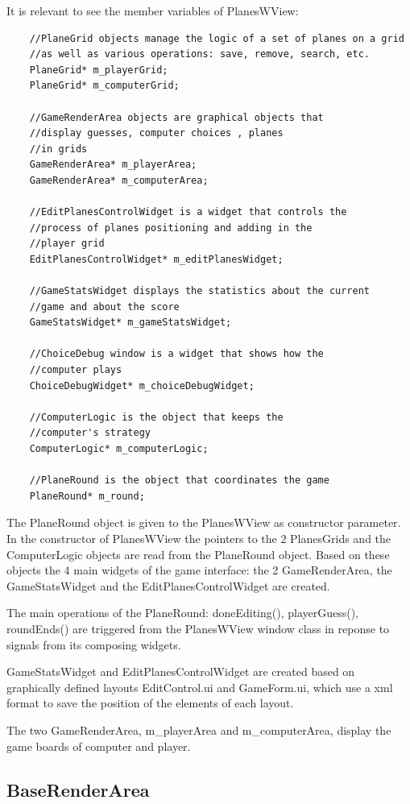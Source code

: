 It is relevant to see the member variables of PlanesWView:

\begin{lstlisting}
	//PlaneGrid objects manage the logic of a set of planes on a grid
	//as well as various operations: save, remove, search, etc.
	PlaneGrid* m_playerGrid;
	PlaneGrid* m_computerGrid;
	
	//GameRenderArea objects are graphical objects that
	//display guesses, computer choices , planes
	//in grids
	GameRenderArea* m_playerArea;
	GameRenderArea* m_computerArea;
	
	//EditPlanesControlWidget is a widget that controls the
	//process of planes positioning and adding in the
	//player grid
	EditPlanesControlWidget* m_editPlanesWidget;
	
	//GameStatsWidget displays the statistics about the current
	//game and about the score
	GameStatsWidget* m_gameStatsWidget;
	
	//ChoiceDebug window is a widget that shows how the
	//computer plays
	ChoiceDebugWidget* m_choiceDebugWidget;
	
	//ComputerLogic is the object that keeps the
	//computer's strategy
	ComputerLogic* m_computerLogic;
	
	//PlaneRound is the object that coordinates the game
	PlaneRound* m_round;
\end{lstlisting}

The PlaneRound object is given to the PlanesWView as constructor parameter. In the constructor of PlanesWView the pointers to the 2 PlanesGrids and the ComputerLogic objects are read from the PlaneRound object. Based on these objects the 4 main widgets of the game interface: the 2 GameRenderArea, the GameStatsWidget and the EditPlanesControlWidget are created.

The main operations of the PlaneRound: doneEditing(), playerGuess(), roundEnds() are triggered from the PlanesWView window class in reponse to signals from its composing widgets.

GameStatsWidget and EditPlanesControlWidget are created based on graphically defined layouts EditControl.ui and GameForm.ui, which use a xml format to save the position of the elements of each layout.

The two GameRenderArea, m\_playerArea and m\_computerArea, display the game boards of computer and player.


\subsection{BaseRenderArea}

